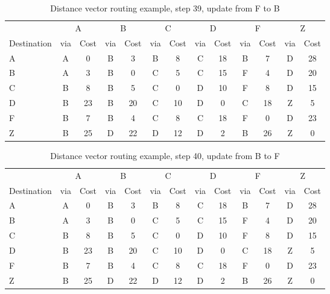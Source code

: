 \begin{table}
    \caption{Distance vector  routing example, step 39, update from F to B }
    \label{tab:dv:step:39}
\begin{tabular}{l|c|c|c|c|c|c|c|c|c|c|c|c}
    \toprule
      & \multicolumn{2}{c|}{A}&\multicolumn{2}{c|}{B}&\multicolumn{2}{c|}{C}&\multicolumn{2}{c|}{D}&\multicolumn{2}{c|}{F}&\multicolumn{2}{c|}{Z} \\
    Destination & via&Cost&via&Cost&via&Cost&via&Cost&via&Cost&via&Cost \\ 
    \midrule
    A & A & 0 &B & 3 &B & 8 &C & 18 &B & 7 &D & 28 
 \\B & A & 3 &B & 0 &C & 5 &C & 15 &F & 4 &D & 20 
 \\C & B & 8 &B & 5 &C & 0 &D & 10 &F & 8 &D & 15 
 \\D & B & 23 &B & 20 &C & 10 &D & 0 &C & 18 &Z & 5 
 \\F & B & 7 &B & 4 &C & 8 &C & 18 &F & 0 &D & 23 
 \\Z & B & 25 &D & 22 &D & 12 &D & 2 &B & 26 &Z & 0 
    \\ \bottomrule 
\end{tabular}
\end{table}
    

\begin{table}
    \caption{Distance vector  routing example, step 40, update from B to F }
    \label{tab:dv:step:40}
\begin{tabular}{l|c|c|c|c|c|c|c|c|c|c|c|c}
    \toprule
      & \multicolumn{2}{c|}{A}&\multicolumn{2}{c|}{B}&\multicolumn{2}{c|}{C}&\multicolumn{2}{c|}{D}&\multicolumn{2}{c|}{F}&\multicolumn{2}{c|}{Z} \\
    Destination & via&Cost&via&Cost&via&Cost&via&Cost&via&Cost&via&Cost \\ 
    \midrule
    A & A & 0 &B & 3 &B & 8 &C & 18 &B & 7 &D & 28 
 \\B & A & 3 &B & 0 &C & 5 &C & 15 &F & 4 &D & 20 
 \\C & B & 8 &B & 5 &C & 0 &D & 10 &F & 8 &D & 15 
 \\D & B & 23 &B & 20 &C & 10 &D & 0 &C & 18 &Z & 5 
 \\F & B & 7 &B & 4 &C & 8 &C & 18 &F & 0 &D & 23 
 \\Z & B & 25 &D & 22 &D & 12 &D & 2 &B & 26 &Z & 0 
    \\ \bottomrule 
\end{tabular}
\end{table}
    

